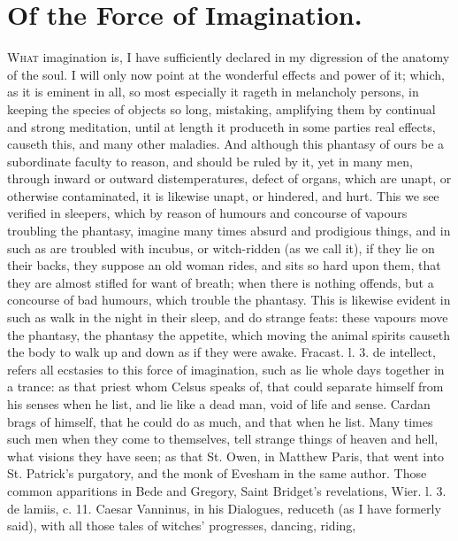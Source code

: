 {%
\section{Of the Force of Imagination.}\label{sec:of-the-force-of-imagination}

\lettrine{W}{hat} imagination is, I have sufficiently declared in my digression of
the anatomy of the soul. I will only now point at the wonderful effects
and power of it; which, as it is eminent in all, so most especially it
rageth in melancholy persons, in keeping the species of objects so
long, mistaking, amplifying them by continual and strong
meditation, until at length it produceth in some parties real effects,
causeth this, and many other maladies. And although this phantasy of
ours be a subordinate faculty to reason, and should be ruled by it, yet
in many men, through inward or outward distemperatures, defect of
organs, which are unapt, or otherwise contaminated, it is likewise
unapt, or hindered, and hurt. This we see verified in sleepers, which
by reason of humours and concourse of vapours troubling the phantasy,
imagine many times absurd and prodigious things, and in such as are
troubled with incubus, or witch-ridden (as we call it), if they lie on
their backs, they suppose an old woman rides, and sits so hard upon
them, that they are almost stifled for want of breath; when there is
nothing offends, but a concourse of bad humours, which trouble the
phantasy. This is likewise evident in such as walk in the night in
their sleep, and do strange feats: these vapours move the
phantasy, the phantasy the appetite, which moving the animal spirits
causeth the body to walk up and down as if they were awake. Fracast. l.
3. de intellect, refers all ecstasies to this force of imagination,
such as lie whole days together in a trance: as that priest whom
Celsus speaks of, that could separate himself from his senses
when he list, and lie like a dead man, void of life and sense. Cardan
brags of himself, that he could do as much, and that when he list. Many
times such men when they come to themselves, tell strange things of
heaven and hell, what visions they have seen; as that St. Owen, in
Matthew Paris, that went into St. Patrick's purgatory, and the monk of
Evesham in the same author. Those common apparitions in Bede and
Gregory, Saint Bridget's revelations, Wier. l. 3. de lamiis, c. 11.
Caesar Vanninus, in his Dialogues, \etc{} reduceth (as I have formerly
said), with all those tales of witches' progresses, dancing, riding,
}
